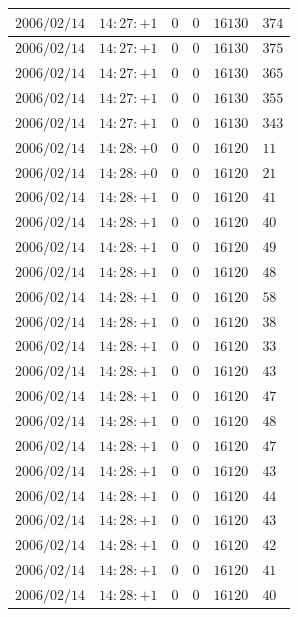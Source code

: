 \documentclass[a4j,papersize,disablejfam,slide,14pt]{jsarticle}
\begin{document}
\begin{description}
\begin{center}
\begin{longtable}{|l|l|l|l|l|l|}
					$2006/02/14$ & $14:27:+1$  & $0$ & $0$ & $16130$ & $374$ \\ \hline
					$2006/02/14$ & $14:27:+1$  & $0$ & $0$ & $16130$ & $375$ \\ \hline
					$2006/02/14$ & $14:27:+1$  & $0$ & $0$ & $16130$ & $365$ \\ \hline
					$2006/02/14$ & $14:27:+1$  & $0$ & $0$ & $16130$ & $355$ \\ \hline
					$2006/02/14$ & $14:27:+1$  & $0$ & $0$ & $16130$ & $343$ \\ \hline
					$2006/02/14$ & $14:28:+0$  & $0$ & $0$ & $16120$ & $11$ \\ \hline
					$2006/02/14$ & $14:28:+0$  & $0$ & $0$ & $16120$ & $21$ \\ \hline
					$2006/02/14$ & $14:28:+1$  & $0$ & $0$ & $16120$ & $41$ \\ \hline
					$2006/02/14$ & $14:28:+1$  & $0$ & $0$ & $16120$ & $40$ \\ \hline
					$2006/02/14$ & $14:28:+1$  & $0$ & $0$ & $16120$ & $49$ \\ \hline
					$2006/02/14$ & $14:28:+1$  & $0$ & $0$ & $16120$ & $48$ \\ \hline
					$2006/02/14$ & $14:28:+1$  & $0$ & $0$ & $16120$ & $58$ \\ \hline
					$2006/02/14$ & $14:28:+1$  & $0$ & $0$ & $16120$ & $38$ \\ \hline
					$2006/02/14$ & $14:28:+1$  & $0$ & $0$ & $16120$ & $33$ \\ \hline
					$2006/02/14$ & $14:28:+1$  & $0$ & $0$ & $16120$ & $43$ \\ \hline
					$2006/02/14$ & $14:28:+1$  & $0$ & $0$ & $16120$ & $47$ \\ \hline
					$2006/02/14$ & $14:28:+1$  & $0$ & $0$ & $16120$ & $48$ \\ \hline
					$2006/02/14$ & $14:28:+1$  & $0$ & $0$ & $16120$ & $47$ \\ \hline
					$2006/02/14$ & $14:28:+1$  & $0$ & $0$ & $16120$ & $43$ \\ \hline
					$2006/02/14$ & $14:28:+1$  & $0$ & $0$ & $16120$ & $44$ \\ \hline
					$2006/02/14$ & $14:28:+1$  & $0$ & $0$ & $16120$ & $43$ \\ \hline
					$2006/02/14$ & $14:28:+1$  & $0$ & $0$ & $16120$ & $42$ \\ \hline
					$2006/02/14$ & $14:28:+1$  & $0$ & $0$ & $16120$ & $41$ \\ \hline
					$2006/02/14$ & $14:28:+1$  & $0$ & $0$ & $16120$ & $40$ \\ \hline

\end{longtable}
\end{center}
\end{description}
\end{document}
